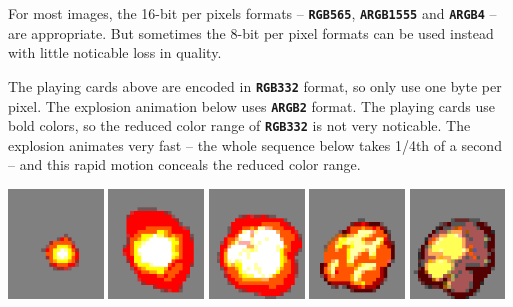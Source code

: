 \documentclass[10pt]{book}
\newcommand{\mach}[1]{\texttt{\textbf{#1}}}
\begin{document}
For most images, the 16-bit per pixels formats --
\mach{RGB565},
\mach{ARGB1555} and
\mach{ARGB4} -- 
are appropriate. But sometimes the 8-bit per pixel formats can be used instead with little noticable loss in quality.

The playing cards above are encoded in
\mach{RGB332} format, so only use one byte per pixel. The explosion animation below uses
\mach{ARGB2} format.
The playing cards use bold colors, so the reduced color range of \mach{RGB332} is not very noticable.
The explosion animates very fast -- the whole sequence below takes 1/4th of a second --
and this rapid motion conceals the reduced color range.

\begin{center}
\includegraphics[width=0.19\textwidth]{previews/nightstrike_1-FIRE-00.png}
\includegraphics[width=0.19\textwidth]{previews/nightstrike_1-FIRE-01.png}
\includegraphics[width=0.19\textwidth]{previews/nightstrike_1-FIRE-02.png}
\includegraphics[width=0.19\textwidth]{previews/nightstrike_1-FIRE-03.png}
\includegraphics[width=0.19\textwidth]{previews/nightstrike_1-FIRE-04.png}

\end{center}
\end{document}
